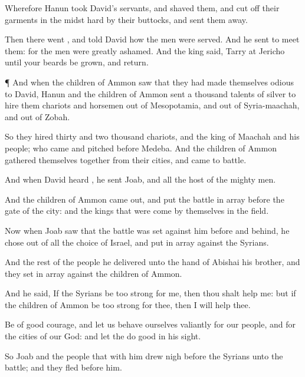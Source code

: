{Wherefore
Hanun
took
David’s
servants, and
shaved them, and cut
off their
garments in the
midst hard by their
buttocks, and sent them
away.

Then there
went
{}, and
told
David how the
men were served. And he
sent to
meet them: for the
men were
greatly
ashamed. And the
king
said,
Tarry at
Jericho until your
beards be
grown, and
{}
return.


\par }{\PP {}¶ And when the
children of
Ammon
saw that they had made themselves
odious to
David,
Hanun and the
children of
Ammon
sent a
thousand
talents of
silver to
hire them
chariots and
horsemen out of
Mesopotamia, and out of
Syria-maachah, and out of
Zobah.

So they
hired
thirty and
two
thousand
chariots, and the
king of
Maachah and his
people; who
came and
pitched
before
Medeba. And the
children of
Ammon gathered themselves
together from their
cities, and
came to
battle.

And when
David
heard
{}, he
sent
Joab, and all the
host of the mighty
men.

And the
children of
Ammon came
out, and put the
battle in
array before the
gate of the
city: and the
kings that were
come
{} by themselves in the
field.

Now when
Joab
saw that the
battle was set against him
before and
behind, he chose
out of all the
choice of
Israel, and put
{} in
array
against the
Syrians.

And the
rest of the
people he
delivered unto the
hand of
Abishai his
brother, and they set
{} in
array
against the
children of
Ammon.

And he
said, If the
Syrians be too
strong for me, then thou shalt
help me: but if the
children of
Ammon be too
strong for thee, then I will
help thee.

Be of good
courage, and let us behave ourselves
valiantly for our
people, and for the
cities of our
God: and let the
{}
do
{}
good in his
sight.

So
Joab and the
people that
{} with him drew
nigh
before the
Syrians unto the
battle; and they
fled
before him.

}
